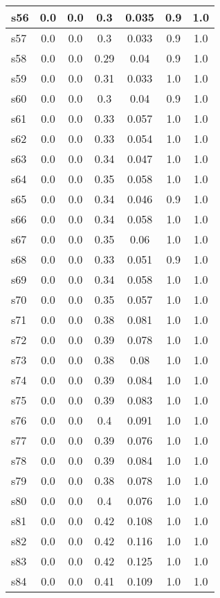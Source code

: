 \documentclass{article}
\begin{document}
\begin{tabular}{|l|c|c|c|c|c|c|}
\hline
s56 &0.0 & 0.0 & 0.3 & 0.035 & 0.9 & 1.0\\
\hline
s57 &0.0 & 0.0 & 0.3 & 0.033 & 0.9 & 1.0\\
\hline
s58 &0.0 & 0.0 & 0.29 & 0.04 & 0.9 & 1.0\\
\hline
s59 &0.0 & 0.0 & 0.31 & 0.033 & 1.0 & 1.0\\
\hline
s60 &0.0 & 0.0 & 0.3 & 0.04 & 0.9 & 1.0\\
\hline
s61 &0.0 & 0.0 & 0.33 & 0.057 & 1.0 & 1.0\\
\hline
s62 &0.0 & 0.0 & 0.33 & 0.054 & 1.0 & 1.0\\
\hline
s63 &0.0 & 0.0 & 0.34 & 0.047 & 1.0 & 1.0\\
\hline
s64 &0.0 & 0.0 & 0.35 & 0.058 & 1.0 & 1.0\\
\hline
s65 &0.0 & 0.0 & 0.34 & 0.046 & 0.9 & 1.0\\
\hline
s66 &0.0 & 0.0 & 0.34 & 0.058 & 1.0 & 1.0\\
\hline
s67 &0.0 & 0.0 & 0.35 & 0.06 & 1.0 & 1.0\\
\hline
s68 &0.0 & 0.0 & 0.33 & 0.051 & 0.9 & 1.0\\
\hline
s69 &0.0 & 0.0 & 0.34 & 0.058 & 1.0 & 1.0\\
\hline
s70 &0.0 & 0.0 & 0.35 & 0.057 & 1.0 & 1.0\\
\hline
s71 &0.0 & 0.0 & 0.38 & 0.081 & 1.0 & 1.0\\
\hline
s72 &0.0 & 0.0 & 0.39 & 0.078 & 1.0 & 1.0\\
\hline
s73 &0.0 & 0.0 & 0.38 & 0.08 & 1.0 & 1.0\\
\hline
s74 &0.0 & 0.0 & 0.39 & 0.084 & 1.0 & 1.0\\
\hline
s75 &0.0 & 0.0 & 0.39 & 0.083 & 1.0 & 1.0\\
\hline
s76 &0.0 & 0.0 & 0.4 & 0.091 & 1.0 & 1.0\\
\hline
s77 &0.0 & 0.0 & 0.39 & 0.076 & 1.0 & 1.0\\
\hline
s78 &0.0 & 0.0 & 0.39 & 0.084 & 1.0 & 1.0\\
\hline
s79 &0.0 & 0.0 & 0.38 & 0.078 & 1.0 & 1.0\\
\hline
s80 &0.0 & 0.0 & 0.4 & 0.076 & 1.0 & 1.0\\
\hline
s81 &0.0 & 0.0 & 0.42 & 0.108 & 1.0 & 1.0\\
\hline
s82 &0.0 & 0.0 & 0.42 & 0.116 & 1.0 & 1.0\\
\hline
s83 &0.0 & 0.0 & 0.42 & 0.125 & 1.0 & 1.0\\
\hline
s84 &0.0 & 0.0 & 0.41 & 0.109 & 1.0 & 1.0\\

\end{tabular}
\end{document}
